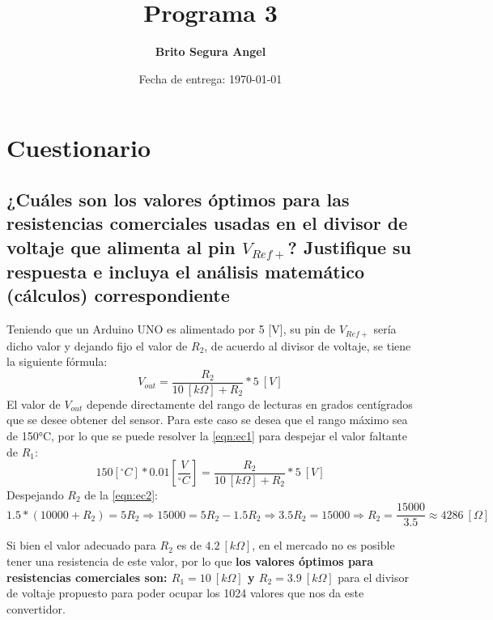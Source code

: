 \documentclass[letterpaper,10.5pt]{article} %
\title{Programa 3}
\author{\textbf{Brito Segura Angel}}
\date{Fecha de entrega: \today}
\begin{document}
    \pagestyle{fancy} %
    \maketitle %
    
    
    \section{Cuestionario}
    \subsection{¿Cuáles son los valores óptimos para las resistencias comerciales usadas en el divisor de voltaje que alimenta al pin $V_{Ref+}$? Justifique su respuesta e incluya el análisis matemático (cálculos) correspondiente}
	    Teniendo que un Arduino UNO es alimentado por 5 [V], su pin de $V_{Ref+}$ sería dicho valor y dejando fijo el valor de $R_2$, de acuerdo al divisor de voltaje, se tiene la siguiente fórmula:
	    \begin{equation}
			\label{eqn:ec1}
			V_{out} = \frac{R_2}{10~[k\Omega] + R_2} * 5~[V]
		\end{equation}
		El valor de $V_{out}$ depende directamente del rango de lecturas en grados centígrados que se desee obtener del sensor. Para este caso se desea que el rango máximo sea de 150°C, por lo que se puede resolver la \cref{eqn:ec1} para despejar el valor faltante de $R_1$:
		\begin{equation}
			\label{eqn:ec2}
			150[^{\circ} C]* 0.01\left[\frac{V}{^{\circ} C}\right] = \frac{R_2}{10~[k\Omega] + R_2} * 5~[V]
		\end{equation}
		Despejando $R_2$ de la \cref{eqn:ec2}:
		\[
			1.5 * (10000 + R_2) = 5R_2 \Rightarrow 15000 = 5R_2 - 1.5R_2 \Rightarrow 3.5R_2 = 15000 \Rightarrow R_2 = \frac{15000}{3.5}\approx 4286~[\Omega]
		\]

		Si bien el valor adecuado para $R_2$ es de $4.2~[k\Omega]$, en el mercado \cite{res_comerciales} no es posible tener una resistencia de este valor, por lo que \textbf{los valores óptimos para resistencias comerciales son: $R_1 = 10~[k\Omega]$ y $R_2 = 3.9~[k\Omega]$} para el divisor de voltaje propuesto para poder ocupar los 1024 valores que nos da este convertidor.\newline
\end{document}
